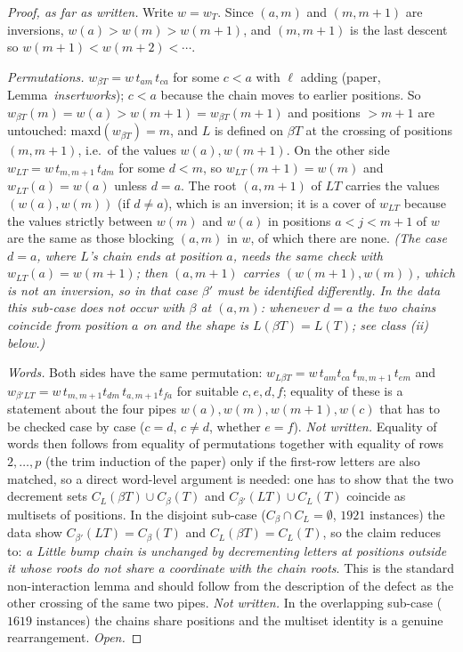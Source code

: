 \documentclass{amsart}
\theoremstyle{definition}
\theoremstyle{remark}
\newcommand{\maxd}{\mathrm{maxd}}
\newcommand{\wof}[1]{w_{#1}}
\begin{document}
\begin{proof}[Proof, as far as written]
Write $w=\wof T$. Since $(a,m)$ and $(m,m+1)$ are inversions, $w(a)>w(m)>w(m+1)$, and $(m,m+1)$ is the last descent so $w(m+1)<w(m+2)<\cdots$.

\emph{Permutations.} $\wof{\beta T}=w\,t_{am}\,t_{ca}$ for some $c<a$ with $\ell$ adding (paper, Lemma~\emph{insertworks}); $c<a$ because the chain moves to earlier positions. So $\wof{\beta T}(m)=w(a)>w(m+1)=\wof{\beta T}(m+1)$ and positions $>m+1$ are untouched: $\maxd(\wof{\beta T})=m$, and $L$ is defined on $\beta T$ at the crossing of positions $(m,m+1)$, i.e.\ of the values $w(a),w(m+1)$. On the other side $\wof{LT}=w\,t_{m,m+1}\,t_{dm}$ for some $d<m$, so $\wof{LT}(m+1)=w(m)$ and $\wof{LT}(a)=w(a)$ unless $d=a$. The root $(a,m+1)$ of $LT$ carries the values $(w(a),w(m))$ (if $d\neq a$), which is an inversion; it is a cover of $\wof{LT}$ because the values strictly between $w(m)$ and $w(a)$ in positions $a<j<m+1$ of $w$ are the same as those blocking $(a,m)$ in $w$, of which there are none. \emph{(The case $d=a$, where $L$'s chain ends at position $a$, needs the same check with $\wof{LT}(a)=w(m+1)$; then $(a,m+1)$ carries $(w(m+1),w(m))$, which is not an inversion, so in that case $\beta'$ must be identified differently. In the data this sub-case does not occur with $\beta$ at $(a,m)$: whenever $d=a$ the two chains coincide from position $a$ on and the shape is $L(\beta T)=L(T)$; see class (ii) below.)}

\emph{Words.} Both sides have the same permutation: $\wof{L\beta T}=w\,t_{am}t_{ca}\,t_{m,m+1}\,t_{em}$ and $\wof{\beta' LT}=w\,t_{m,m+1}t_{dm}\,t_{a,m+1}t_{fa}$ for suitable $c,e,d,f$; equality of these is a statement about the four pipes $w(a),w(m),w(m+1),w(c)$ that has to be checked case by case ($c=d$, $c\neq d$, whether $e=f$). \emph{Not written.} Equality of words then follows from equality of permutations together with equality of rows $2,\ldots,p$ (the trim induction of the paper) only if the first-row letters are also matched, so a direct word-level argument is needed: one has to show that the two decrement sets $C_L(\beta T)\cup C_\beta(T)$ and $C_{\beta'}(LT)\cup C_L(T)$ coincide as multisets of positions. In the disjoint sub-case ($C_\beta\cap C_L=\emptyset$, $1921$ instances) the data show $C_{\beta'}(LT)=C_\beta(T)$ and $C_L(\beta T)=C_L(T)$, so the claim reduces to: \emph{a Little bump chain is unchanged by decrementing letters at positions outside it whose roots do not share a coordinate with the chain roots}. This is the standard non-interaction lemma and should follow from the description of the defect as the other crossing of the same two pipes. \emph{Not written.} In the overlapping sub-case ($1619$ instances) the chains share positions and the multiset identity is a genuine rearrangement. \emph{Open.}
\end{proof}
\end{document}
